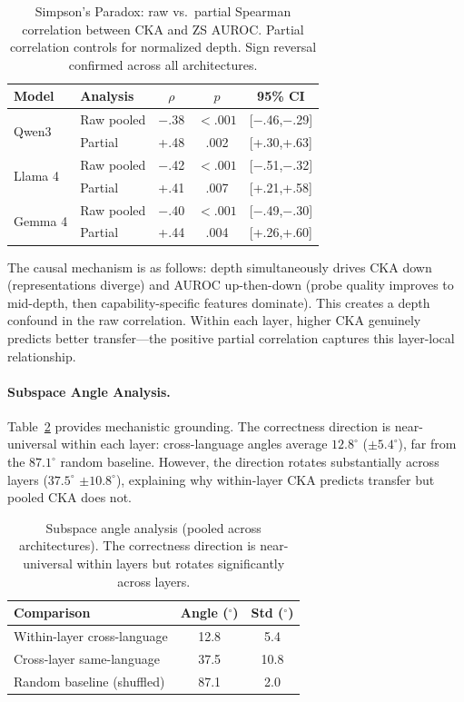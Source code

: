 \documentclass[11pt,a4paper]{article}
\begin{document}
\begin{table}[t]
\centering
\small
\begin{tabular}{@{}llccc@{}}
\toprule
\textbf{Model} & \textbf{Analysis} & $\rho$ & $p$ & \textbf{95\% CI} \\
\midrule
\multirow{2}{*}{Qwen3} & Raw pooled & $-$.38 & ${<}.001$ & [$-$.46,$-$.29] \\
 & Partial & +.48 & .002 & [+.30,+.63] \\
\midrule
\multirow{2}{*}{Llama 4} & Raw pooled & $-$.42 & ${<}.001$ & [$-$.51,$-$.32] \\
 & Partial & +.41 & .007 & [+.21,+.58] \\
\midrule
\multirow{2}{*}{Gemma 4} & Raw pooled & $-$.40 & ${<}.001$ & [$-$.49,$-$.30] \\
 & Partial & +.44 & .004 & [+.26,+.60] \\
\bottomrule
\end{tabular}
\caption{Simpson's Paradox: raw vs.\ partial Spearman correlation between CKA and ZS AUROC. Partial correlation controls for normalized depth. Sign reversal confirmed across all architectures.}
\label{tab:simpson}
\end{table}

The causal mechanism is as follows: depth simultaneously drives CKA down (representations diverge) and AUROC up-then-down (probe quality improves to mid-depth, then capability-specific features dominate).
This creates a depth confound in the raw correlation.
Within each layer, higher CKA genuinely predicts better transfer---the positive partial correlation captures this layer-local relationship.

\paragraph{Subspace Angle Analysis.}
Table~\ref{tab:subspace} provides mechanistic grounding.
The correctness direction is near-universal within each layer: cross-language angles average $12.8^{\circ}$ ($\pm 5.4^{\circ}$), far from the $87.1^{\circ}$ random baseline.
However, the direction rotates substantially across layers ($37.5^{\circ}$ $\pm 10.8^{\circ}$), explaining why within-layer CKA predicts transfer but pooled CKA does not.

\begin{table}[t]
\centering
\small
\begin{tabular}{@{}lcc@{}}
\toprule
\textbf{Comparison} & \textbf{Angle ($^{\circ}$)} & \textbf{Std ($^{\circ}$)} \\
\midrule
Within-layer cross-language & 12.8 & 5.4 \\
Cross-layer same-language & 37.5 & 10.8 \\
Random baseline (shuffled) & 87.1 & 2.0 \\
\bottomrule
\end{tabular}
\caption{Subspace angle analysis (pooled across architectures). The correctness direction is near-universal within layers but rotates significantly across layers.}
\label{tab:subspace}
\end{table}
\end{document}
